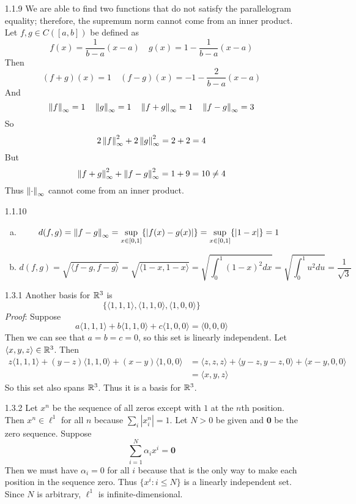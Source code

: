 \documentclass[../../Solutions.tex]{subfiles}
\begin{document}
\begin{itemize}
	\item [1.1.9] We are able to find two functions that do not satisfy the parallelogram equality; therefore, the supremum norm cannot come from an inner product.
	Let $f,g \in C([a,b])$ be defined as
	$$ f(x) = \frac{1}{b-a}(x-a) \quad g(x)=1-\frac{1}{b-a}(x-a) $$
	Then
	$$ (f+g)(x) = 1 \quad (f-g)(x) = -1-\frac{2}{b-a}(x-a) $$
	And
	$$ \left\lVert f\right\rVert_\infty = 1 \quad \left\lVert g\right\rVert_\infty = 1 \quad \left\lVert f+g\right\rVert_\infty = 1 \quad \left\lVert f-g\right\rVert_\infty = 3 $$
	So
	$$ 2\left\lVert f\right\rVert_\infty^2 + 2\left\lVert g\right\rVert_\infty^2 = 2+2 = 4 $$
	But
	$$ \left\lVert f+g\right\rVert_\infty^2+\left\lVert f-g\right\rVert_\infty^2 = 1+9 = 10 \neq 4 $$
	Thus $\left\lVert\cdot\right\rVert_\infty$ cannot come from an inner product.
	
	\item [1.1.10]
	\begin{enumerate}[(a)]
		\item \begin{equation*}
			d(f,g) = \left\lVert f-g\right\rVert_\infty = \sup_{x\in [0,1]}\{|f(x)-g(x)|\} = \sup_{x\in [0,1]}\{|1-x|\} = 1
		\end{equation*}
		\item \begin{equation*}
			d(f,g) = \sqrt{\langle f-g , f-g \rangle} = \sqrt{\langle 1-x,1-x \rangle}
				 = \sqrt{\int_{0}^{1} (1-x)^2 dx} = \sqrt{\int_0^1 u^2 du} = \frac{1}{\sqrt{3}}
		\end{equation*}
	\end{enumerate}
	
	\item [1.3.1] Another basis for $\mathbb{R}^3$ is
	$$ \{ \langle 1,1,1 \rangle , \langle 1,1,0 \rangle , \langle 1,0,0 \rangle \} $$
	\textit{Proof}: Suppose
	$$ a\langle 1,1,1 \rangle + b\langle 1,1,0 \rangle + c\langle 1,0,0 \rangle = \langle 0,0,0 \rangle $$
	Then we can see that $a = b = c = 0$, so this set is linearly independent.
	Let $\langle x,y,z \rangle \in \mathbb{R}^3$.
	Then
	\begin{equation*} \begin{split}
		z\langle 1,1,1 \rangle + (y-z)\langle 1,1,0 \rangle + (x-y)\langle 1,0,0 \rangle &
			= \langle z,z,z \rangle + \langle y-z,y-z,0 \rangle + \langle x-y,0,0 \rangle \\
			& = \langle x,y,z \rangle
	\end{split} \end{equation*}
	So this set also spans $\mathbb{R}^3$.
	Thus it is a basis for $\mathbb{R}^3$.
	
	\item [1.3.2] Let $x^n$ be the sequence of all zeros except with $1$ at the $n$th position.
	Then $x^n \in \ell^1$ for all $n$ because $\sum_i |x^n_i| = 1$.
	Let $N > 0$ be given and $\mathbf{0}$ be the zero sequence.
	Suppose
	$$ \sum_{i = 1}^N \alpha_i x^i = \mathbf{0} $$
	Then we must have $\alpha_i = 0$ for all $i$ because that is the only way to make each position in the sequence zero.
	Thus $\{x^i : i \leq N \}$ is a linearly independent set.
	Since $N$ is arbitrary, $\ell^1$ is infinite-dimensional.
	

\end{itemize}
\end{document}
